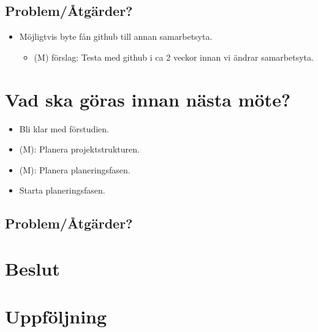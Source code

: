 \subsection*{Problem/Åtgärder?}
\begin{itemize}[noitemsep]
    \item Möjligtvis byte fån github till annan samarbetsyta.
    \begin{itemize}[noitemsep]
        \item (M) förslag: Testa med github i ca 2 veckor innan vi ändrar samarbetsyta.
    \end{itemize}
\end{itemize}

\section*{Vad ska göras innan nästa möte?}
\begin{itemize}[noitemsep]
    \item Bli klar med förstudien.
    \item (M): Planera projektstrukturen.
    \item (M): Planera planeringsfasen.
    \item Starta planeringsfasen.
\end{itemize}

\subsection*{Problem/Åtgärder?}

\section*{Beslut}

\section*{Uppföljning}